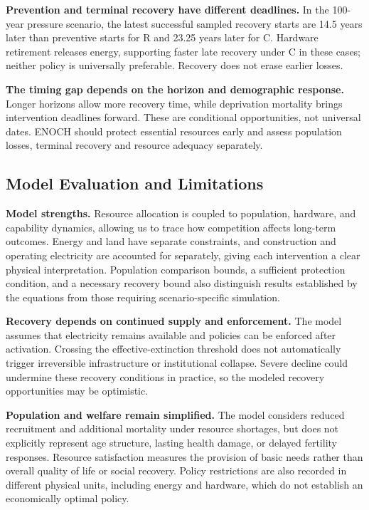 \documentclass[12pt,a4paper]{article}
\theoremstyle{remark}
\begin{document}
\textbf{Prevention and terminal recovery have different deadlines.} In the 100-year pressure scenario, the latest successful sampled recovery starts are 14.5 years later than preventive starts for R and 23.25 years later for C. Hardware retirement releases energy, supporting faster late recovery under C in these cases; neither policy is universally preferable. Recovery does not erase earlier losses.

\textbf{The timing gap depends on the horizon and demographic response.} Longer horizons allow more recovery time, while deprivation mortality brings intervention deadlines forward. These are conditional opportunities, not universal dates. ENOCH should protect essential resources early and assess population losses, terminal recovery and resource adequacy separately.

\subsection{Model Evaluation and Limitations}

\textbf{Model strengths.} Resource allocation is coupled to population, hardware, and capability dynamics, allowing us to trace how competition affects long-term outcomes. Energy and land have separate constraints, and construction and operating electricity are accounted for separately, giving each intervention a clear physical interpretation. Population comparison bounds, a sufficient protection condition, and a necessary recovery bound also distinguish results established by the equations from those requiring scenario-specific simulation.

\textbf{Recovery depends on continued supply and enforcement.} The model assumes that electricity remains available and policies can be enforced after activation. Crossing the effective-extinction threshold does not automatically trigger irreversible infrastructure or institutional collapse. Severe decline could undermine these recovery conditions in practice, so the modeled recovery opportunities may be optimistic.

\textbf{Population and welfare remain simplified.} The model considers reduced recruitment and additional mortality under resource shortages, but does not explicitly represent age structure, lasting health damage, or delayed fertility responses. Resource satisfaction measures the provision of basic needs rather than overall quality of life or social recovery. Policy restrictions are also recorded in different physical units, including energy and hardware, which do not establish an economically optimal policy.
\end{document}
